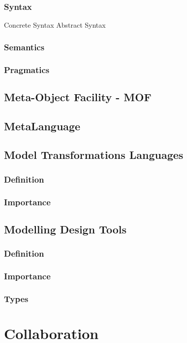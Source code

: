\subsubsection{Syntax}
        Concrete Syntax
        Abstract Syntax
\subsubsection{Semantics}
\subsubsection{Pragmatics}

\subsection{Meta-Object Facility - MOF}

\subsection{MetaLanguage}

\subsection{Model Transformations Languages}
\subsubsection{Definition}
\subsubsection{Importance}

\subsection{Modelling Design Tools}
\subsubsection{Definition}
\subsubsection{Importance}
\subsubsection{Types}

\section{Collaboration}

